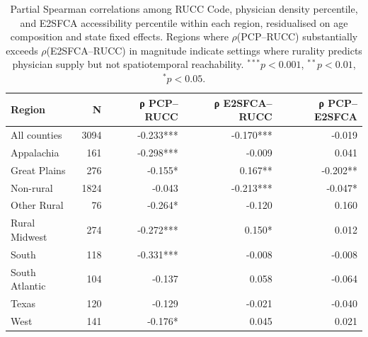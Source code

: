 \begin{table}[ht]
\centering
\small
\caption{Partial Spearman correlations among RUCC Code, physician density percentile, and E2SFCA accessibility percentile within each region, residualised on age composition and state fixed effects. Regions where $\rho$(PCP--RUCC) substantially exceeds $\rho$(E2SFCA--RUCC) in magnitude indicate settings where rurality predicts physician supply but not spatiotemporal reachability. $^{***}p<0.001$, $^{**}p<0.01$, $^{*}p<0.05$.}
\label{tab:access_rucc_correlation_by_region}
\begin{tabular}{lrrrr}
\toprule
Region & N & ρ PCP–RUCC & ρ E2SFCA–RUCC & ρ PCP–E2SFCA \\
\midrule
All counties & 3094 & -0.233*** & -0.170*** & -0.019 \\
Appalachia & 161 & -0.298*** & -0.009 & 0.041 \\
Great Plains & 276 & -0.155* & 0.167** & -0.202** \\
Non-rural & 1824 & -0.043 & -0.213*** & -0.047* \\
Other Rural & 76 & -0.264* & -0.120 & 0.160 \\
Rural Midwest & 274 & -0.272*** & 0.150* & 0.012 \\
South & 118 & -0.331*** & -0.008 & -0.008 \\
South Atlantic & 104 & -0.137 & 0.058 & -0.064 \\
Texas & 120 & -0.129 & -0.021 & -0.040 \\
West & 141 & -0.176* & 0.045 & 0.021 \\
\bottomrule
\end{tabular}
\end{table}
